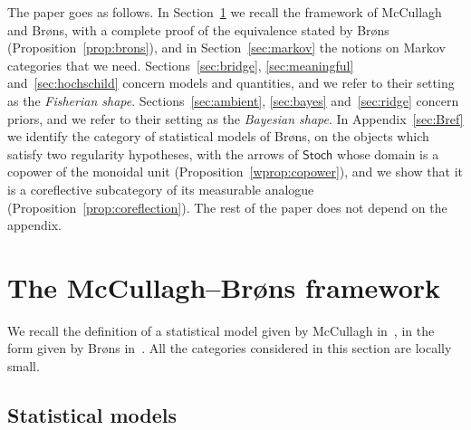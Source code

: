 \documentclass[11pt,a4paper]{article}
\theoremstyle{plain}
\theoremstyle{definition}
\theoremstyle{remark}
\newcommand{\cat}[1]{\mathsf{#1}}
\newcommand{\Stoch}{\cat{Stoch}}
\begin{document}
The paper goes as follows. In Section~\ref{sec:mcb} we recall the framework of
McCullagh and Br\o ns, with a complete proof of the equivalence stated by
Br\o ns (Proposition~\ref{prop:brons}), and in Section~\ref{sec:markov} the
notions on Markov categories that we need.
Sections~\ref{sec:bridge}, \ref{sec:meaningful} and~\ref{sec:hochschild}
concern models and quantities, and we refer to their setting as the
\emph{Fisherian shape}. Sections~\ref{sec:ambient}, \ref{sec:bayes}
and~\ref{sec:ridge} concern priors, and we refer to their setting as the
\emph{Bayesian shape}. In Appendix~\ref{sec:Bref} we identify the category of
statistical models of Br\o ns, on the objects which satisfy two regularity
hypotheses, with the arrows of $\Stoch$ whose domain is a copower of the
monoidal unit (Proposition~\ref{wprop:copower}), and we show that it is a
coreflective subcategory of its measurable analogue
(Proposition~\ref{prop:coreflection}). The rest of the paper does not depend
on the appendix.
\section{The McCullagh--Br\o ns framework}\label{sec:mcb}

We recall the definition of a statistical model given by McCullagh
in~\cite{mccullagh_what_2002}, in the form given by Br\o ns
in~\cite{brons_discussion_2002}. All the categories considered in this section
are locally small.

\subsection{Statistical models}
\end{document}
